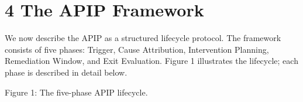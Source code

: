 \section{4  The APIP Framework}

We now describe the APIP as a structured lifecycle protocol. The framework consists of five phases: Trigger, Cause Attribution, Intervention Planning, Remediation Window, and Exit Evaluation. Figure 1 illustrates the lifecycle; each phase is described in detail below.

Figure 1: The five-phase APIP lifecycle.


